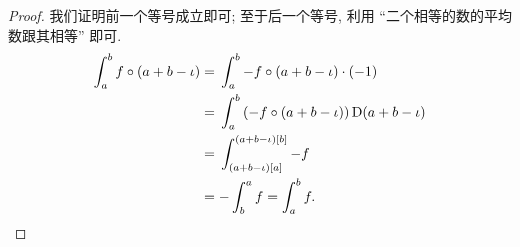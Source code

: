 \begin{proof}
    我们证明前一个等号成立即可;
    至于后一个等号, 利用
    ``二个相等的数的平均数跟其相等''
    即可.
    \begin{align*}
        \int_{a}^{b} {f \circ (a + b - \iota)}
        = {} & \int_{a}^{b} {-f \circ (a + b - \iota) \cdot (-1)}                    \\
        = {} & \int_{a}^{b} {(-f \circ (a + b - \iota))\,\mathrm{D} (a + b - \iota)} \\
        = {} & \int_{(a + b - \iota)[a]}^{(a + b - \iota)[b]} {-f}                   \\
        = {} & {-\int_{b}^{a} {f}}
        = \int_{a}^{b} {f}. \qedhere
    \end{align*}
\end{proof}

